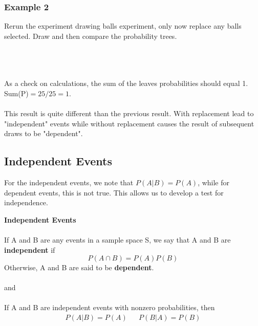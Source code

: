 \documentclass[14pt]{extarticle}
\begin{document}
\subsubsection{Example 2}
Rerun the experiment drawing balls experiment, only now replace any balls selected. Draw and then compare the probability trees.
\\\\
\\\\
As a check on calculations, the sum of the leaves probabilities should equal 1. Sum(P)$=25/25=1$.
\\\\
This result is quite different than the previous result. With replacement lead to "independent" events while without replacement causes the result of subsequent draws to be "dependent".

\subsection{Independent Events}
For the independent events, we note that $P(A|B)=P(A)$, while for dependent events, this is not true. This allows us to develop a test for independence.
\begin{tcolorbox}[enhanced jigsaw,colback=bg,boxrule=0pt,arc=0pt] 
	\textbf{Independent Events}\\\\
	If A and B are any events in a sample space S, we say that A and B are \textbf{independent} if 
	$$ P(A\cap B) = P(A)P(B)$$
	Otherwise, A and B are said to be \textbf{dependent}.
	\\\\
	and \\\\
	If A and B are independent events with nonzero probabilities, then 
	\begin{align*}
		P(A|B) = P(A) & & P(B|A)=P(B)
	\end{align*}
\end{tcolorbox}
\end{document}
